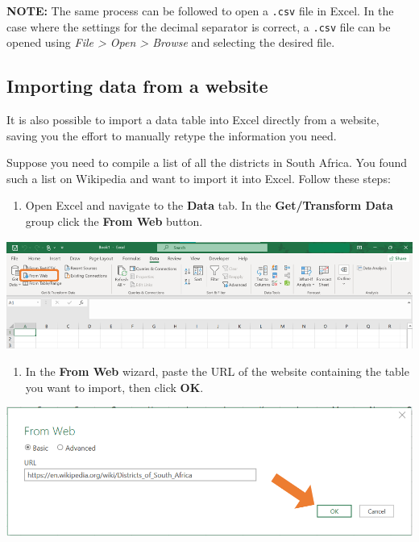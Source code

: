 \documentclass[
]{book}
\providecommand{\tightlist}{%
  \setlength{\itemsep}{0pt}\setlength{\parskip}{0pt}}
\begin{document}
\textbf{NOTE:} The same process can be followed to open a \texttt{.csv} file in Excel. In the case where the settings for the decimal separator is correct, a \texttt{.csv} file can be opened using \textit{File > Open > Browse} and selecting the desired file.

\subsection{Importing data from a website}\label{importing-data-from-a-website}

It is also possible to import a data table into Excel directly from a website, saving you the effort to manually retype the information you need.

Suppose you need to compile a list of all the districts in South Africa. You found such a list on Wikipedia and want to import it into Excel. Follow these steps:

\begin{enumerate}
\def\labelenumi{\arabic{enumi}.}
\tightlist
\item
  Open Excel and navigate to the \textbf{Data} tab. In the \textbf{Get/Transform Data} group click the \textbf{From Web} button.
\end{enumerate}

\begin{center}\includegraphics[width=0.7\linewidth]{Figures/web_1} \end{center}

\newpage

\begin{enumerate}
\def\labelenumi{\arabic{enumi}.}
\setcounter{enumi}{1}
\tightlist
\item
  In the \textbf{From Web} wizard, paste the URL of the website containing the table you want to import, then click \textbf{OK}.
\end{enumerate}

\begin{center}\includegraphics[width=0.6\linewidth]{Figures/web_2} \end{center}
\end{document}
